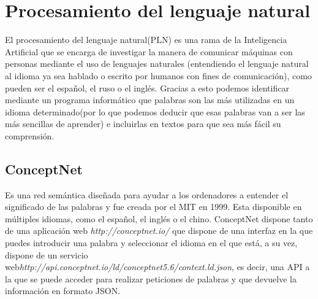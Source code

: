 \section{Procesamiento del lenguaje natural}
 
El procesamiento del lenguaje natural(PLN) es una rama de la Inteligencia Artificial que se encarga de investigar la manera de comunicar máquinas con personas mediante el uso de lenguajes naturales (entendiendo el lenguaje natural al idioma ya sea hablado o escrito por humanos con fines de comunicación), como pueden ser el español, el ruso o el inglés. Gracias a esto podemos identificar mediante un programa informático que palabras son las más utilizadas en un idioma determinado(por lo que podemos deducir que esas palabras van a ser las más sencillas de aprender) e incluirlas en textos para que sea más fácil su comprensión.

\subsection{ConceptNet} 

Es una red semántica diseñada para ayudar a los ordenadores a entender el significado de las palabras y fue creada por el MIT en 1999. Esta disponible en múltiples idiomas, como el español, el inglés o el chino. ConceptNet dispone tanto de una aplicación web \textit{http://conceptnet.io/} 
	 que dispone de una interfaz en la que puedes introducir una palabra y seleccionar el idioma en el que está, a su vez, dispone de un servicio web\textit{http://api.conceptnet.io/ld/conceptnet5.6/context.ld.json}, es decir, una API a la que se puede acceder para realizar peticiones de palabras y que devuelve la información en formato JSON.

